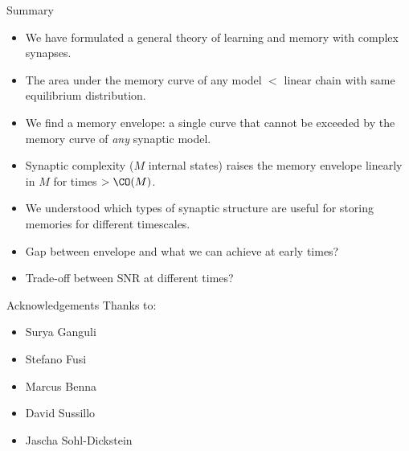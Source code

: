 \documentclass{beamer}%
\begin{document}
\begin{frame}{Summary}
%
  \begin{itemize}
    \item We have formulated a general theory of learning and memory with complex synapses.
    \item The area under the memory curve of any model $<$ linear chain with same equilibrium distribution.
    \item We find a memory envelope: a single curve that cannot be exceeded by the memory curve of \emph{any} synaptic model.
    \item Synaptic complexity ($M$ internal states) raises the memory envelope linearly in $M$ for times $> \CO(M)$.
    \item We understood which types of synaptic structure are useful for storing memories for different timescales.
    \item Gap between envelope and what we can achieve at early times?
    \item Trade-off between SNR at different times?
  \end{itemize}

%
\end{frame}





%
%
%

\begin{frame}{Acknowledgements}
%
 Thanks to:
 \begin{itemize}
   \item Surya Ganguli
   \item Stefano Fusi
   \item Marcus Benna
   \item David Sussillo
   \item Jascha Sohl-Dickstein
 \end{itemize}
%
\end{frame}

\appendix
\end{document}
